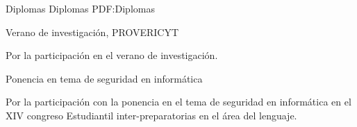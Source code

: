\Section
{Diplomas}
{Diplomas}
{PDF:Diplomas}



\BulletItem
Verano de investigación, PROVERICYT
\hfill
{}
\begin{Detail}
	\Item
	Por la participación en el verano de investigación.
\end{Detail}

\Gap

\BulletItem
Ponencia en tema de seguridad en informática
\hfill
{}
\begin{Detail}
	\Item
	Por la participación con la ponencia en el tema de seguridad en informática en el XIV congreso Estudiantil inter-preparatorias en el área del lenguaje.
\end{Detail}
